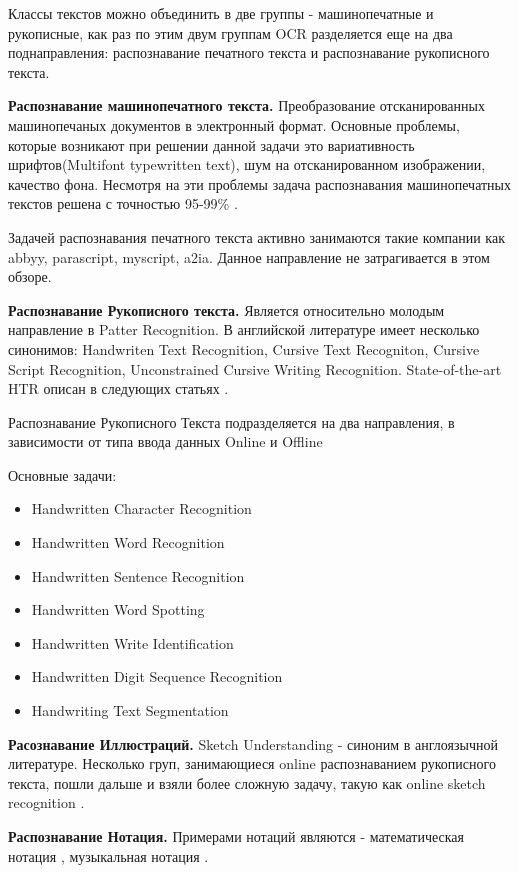 Классы текстов можно объединить в две группы - машинопечатные и рукописные, как раз по этим двум группам OCR разделяется еще на два поднаправления: распознавание печатного текста и распознавание рукописного текста.

\textbf{Распознавание машинопечатного текста.} Преобразование отсканированных машинопечаных документов в электронный формат. Основные проблемы, которые возникают при решении данной задачи это вариативность шрифтов(Multifont typewritten text), шум на отсканированном изображении, качество фона. Несмотря на эти проблемы задача распознавания машинопечатных текстов решена с точностью 95-99\% \cite{breuel2013high}.

Задачей распознавания печатного текста активно занимаются такие компании как abbyy, parascript, myscript, a2ia. Данное направление не затрагивается в этом обзоре.

\textbf{Распознавание Рукописного текста.} Является относительно молодым направление в Patter Recognition. В английской литературе имеет несколько синонимов: Handwriten Text Recognition, Cursive Text Recogniton, Cursive Script Recognition, Unconstrained Cursive Writing Recognition. State-of-the-art HTR описан в следующих статьях \cite{rehman2012off} \cite{bunke2003recognition} \cite{fujisawa2008forty} \cite{steinherz1999offline}.

Распознавание Рукописного Текста подразделяется на два направления, в зависимости от типа ввода данных Online и Offline

\noindent Основные задачи:
\begin{itemize}
  \item Handwritten Character Recognition
  \item Handwritten Word Recognition
  \item Handwritten Sentence Recognition
  \item Handwritten Word Spotting
  \item Handwritten Write Identification
  \item Handwritten Digit Sequence Recognition
  \item Handwriting Text Segmentation
\end{itemize}

\textbf{Расознавание Иллюстраций.} Sketch Understanding - синоним в англоязычной литературе. Несколько груп, занимающиеся online распознаванием рукописного текста, пошли дальше и взяли более сложную задачу, такую как online sketch recognition \cite{davis2007magic}.

\textbf{Распознавание Нотация.} Примерами нотаций являются - математическая нотация \cite{miyao2004online}, музыкальная нотация \cite{mitobe2004fast}.



